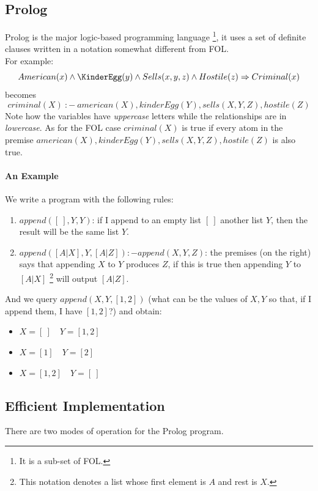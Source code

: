 \documentclass[10pt,a4paper]{article}
\begin{document}
\begin{itemize}
\section{Prolog}
Prolog is the major logic-based programming language \footnote{It is a sub-set of FOL.}, it uses a set of definite clauses written in a notation somewhat different from FOL.\\ 
For example:
\[American(x)\wedge \KinderEgg(y)\wedge Sells(x,y,z)\wedge Hostile(z)\Rightarrow Criminal(x)\]
becomes
\[criminal(X)\ :-\ american(X), kinderEgg(Y), sells(X,Y,Z), hostile(Z)\]
Note how the variables have \textit{uppercase} letters while the relationships are in \textit{lowercase}. As for the FOL case $criminal(X)$ is true if every atom in the premise $american(X), kinderEgg(Y), sells(X,Y,Z), hostile(Z)$ is also true.\\

\paragraph{An Example}
We write a program with the following rules:
\begin{enumerate}
\item $append([\ ],Y,Y)$: if I append to an empty list $[\ ]$ another list $Y$, then the result will be the same list $Y$.
\item $append([A|X],Y,[A|Z]) :- append(X,Y,Z)$: the premises (on the right) says that appending $X$ to $Y$ produces $Z$, if this is true then appending $Y$ to $[A|X]$ \footnote{This notation denotes a list whose first element is $A$ and rest is $X$.} will output $[A|Z]$. 
\end{enumerate}
And we query $append(X,Y,[1,2])$ (what can be the values of $X,Y$ so that, if I append them, I have $[1,2]$?) and obtain:
\begin{itemize}
\item $X=[\ ]\quad Y=[1,2]$
\item $X=[1]\quad Y=[2]$
\item $X=[1,2]\quad Y=[\ ]$
\end{itemize}


\subsection{Efficient Implementation}
There are two modes of operation for the Prolog program. 



\end{itemize}
\end{document}
